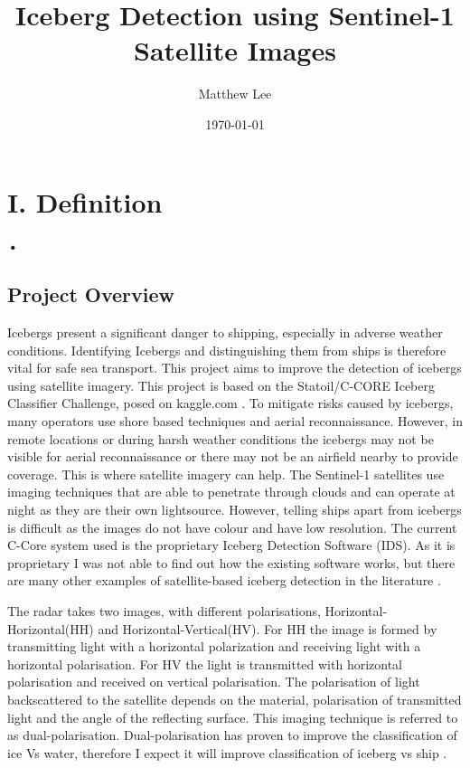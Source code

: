 \documentclass{article}
\begin{document}
\title{Iceberg Detection using Sentinel-1 Satellite Images}
\author{Matthew Lee}
\date{\today}
\maketitle{}
\newpage{}
\section{I. Definition}
\paragraph{•}


\subsection{Project Overview}
Icebergs present a significant danger to shipping, especially in adverse weather conditions. Identifying Icebergs and distinguishing them from ships is therefore vital for safe sea transport. This project aims to improve the detection of icebergs using satellite imagery. This project is based on the Statoil/C-CORE Iceberg Classifier Challenge, posed on kaggle.com \cite{kaggle}. To mitigate risks caused by icebergs, many operators use shore based techniques and aerial reconnaissance. However, in remote locations or during harsh weather conditions the icebergs may not be visible for aerial reconnaissance or there may not be an airfield nearby to provide coverage. This is where satellite imagery can help. The Sentinel-1 satellites use imaging techniques that are able to penetrate through clouds and can operate at night as they are their own lightsource. However, telling ships apart from icebergs is difficult as the images do not have colour and have low resolution. The current C-Core system used is the proprietary Iceberg Detection Software (IDS). As it is proprietary I was not able to find out how the existing software works, but there are many other examples of satellite-based iceberg detection in the literature  \cite{c-core,bentes}. 

The radar takes two images, with different polarisations,  Horizontal-Horizontal(HH) and Horizontal-Vertical(HV). For HH the image is formed by transmitting light with a horizontal polarization and receiving light with a horizontal polarisation. For HV the light is transmitted with horizontal polarisation and received on vertical polarisation. The polarisation of light backscattered to the satellite depends on the material, polarisation of transmitted light and the angle of the reflecting surface. This imaging technique is referred to as dual-polarisation. Dual-polarisation has proven to improve the classification of ice Vs water, therefore I expect it will improve classification of iceberg vs ship \cite{radarsat-mode-selection,yu}. 
\end{document}
